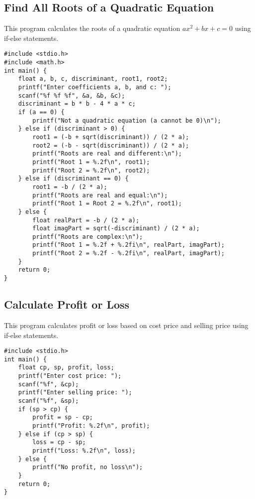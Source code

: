 \documentclass[a4paper,12pt]{article}
\begin{document}
\newpage

\subsection{Find All Roots of a Quadratic Equation}
This program calculates the roots of a quadratic equation \(ax^2 + bx + c = 0\) using if-else statements.

\begin{lstlisting}[caption={Find All Roots of a Quadratic Equation}]
#include <stdio.h>
#include <math.h>
int main() {
    float a, b, c, discriminant, root1, root2;
    printf("Enter coefficients a, b, and c: ");
    scanf("%f %f %f", &a, &b, &c);
    discriminant = b * b - 4 * a * c;
    if (a == 0) {
        printf("Not a quadratic equation (a cannot be 0)\n");
    } else if (discriminant > 0) {
        root1 = (-b + sqrt(discriminant)) / (2 * a);
        root2 = (-b - sqrt(discriminant)) / (2 * a);
        printf("Roots are real and different:\n");
        printf("Root 1 = %.2f\n", root1);
        printf("Root 2 = %.2f\n", root2);
    } else if (discriminant == 0) {
        root1 = -b / (2 * a);
        printf("Roots are real and equal:\n");
        printf("Root 1 = Root 2 = %.2f\n", root1);
    } else {
        float realPart = -b / (2 * a);
        float imagPart = sqrt(-discriminant) / (2 * a);
        printf("Roots are complex:\n");
        printf("Root 1 = %.2f + %.2fi\n", realPart, imagPart);
        printf("Root 2 = %.2f - %.2fi\n", realPart, imagPart);
    }
    return 0;
}
\end{lstlisting}

\newpage

\subsection{Calculate Profit or Loss}
This program calculates profit or loss based on cost price and selling price using if-else statements.

\begin{lstlisting}[caption={Calculate Profit or Loss}]
#include <stdio.h>
int main() {
    float cp, sp, profit, loss;
    printf("Enter cost price: ");
    scanf("%f", &cp);
    printf("Enter selling price: ");
    scanf("%f", &sp);
    if (sp > cp) {
        profit = sp - cp;
        printf("Profit: %.2f\n", profit);
    } else if (cp > sp) {
        loss = cp - sp;
        printf("Loss: %.2f\n", loss);
    } else {
        printf("No profit, no loss\n");
    }
    return 0;
}
\end{lstlisting}
\end{document}
